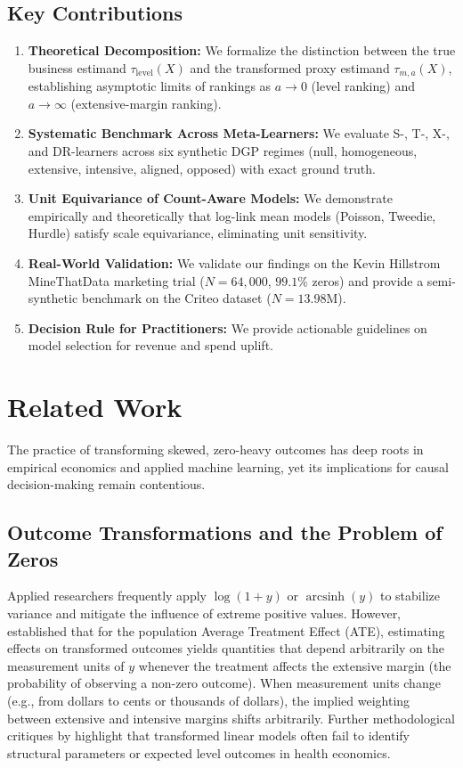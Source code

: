 \documentclass[conference]{IEEEtran}
\newcommand{\taulevel}{\tau_{\text{level}}}
\newcommand{\tauma}{\tau_{m, a}}
\begin{document}
\subsection{Key Contributions}
\begin{enumerate}
    \item \textbf{Theoretical Decomposition:} We formalize the distinction between the true business estimand $\taulevel(X)$ and the transformed proxy estimand $\tauma(X)$, establishing asymptotic limits of rankings as $a \to 0$ (level ranking) and $a \to \infty$ (extensive-margin ranking).
    \item \textbf{Systematic Benchmark Across Meta-Learners:} We evaluate S-, T-, X-, and DR-learners across six synthetic DGP regimes (null, homogeneous, extensive, intensive, aligned, opposed) with exact ground truth.
    \item \textbf{Unit Equivariance of Count-Aware Models:} We demonstrate empirically and theoretically that log-link mean models (Poisson, Tweedie, Hurdle) satisfy scale equivariance, eliminating unit sensitivity.
    \item \textbf{Real-World Validation:} We validate our findings on the Kevin Hillstrom MineThatData marketing trial ($N=64{,}000$, $99.1\%$ zeros) and provide a semi-synthetic benchmark on the Criteo dataset ($N=13.98\text{M}$).
    \item \textbf{Decision Rule for Practitioners:} We provide actionable guidelines on model selection for revenue and spend uplift.
\end{enumerate}

\section{Related Work}
\label{sec:related_work}

The practice of transforming skewed, zero-heavy outcomes has deep roots in empirical economics and applied machine learning, yet its implications for causal decision-making remain contentious.

\subsection{Outcome Transformations and the Problem of Zeros}
Applied researchers frequently apply $\log(1+y)$ or $\operatorname{arcsinh}(y)$ to stabilize variance and mitigate the influence of extreme positive values. However, \cite{chen2024logszeros} established that for the population Average Treatment Effect (ATE), estimating effects on transformed outcomes yields quantities that depend arbitrarily on the measurement units of $y$ whenever the treatment affects the extensive margin (the probability of observing a non-zero outcome). When measurement units change (e.g., from dollars to cents or thousands of dollars), the implied weighting between extensive and intensive margins shifts arbitrarily. Further methodological critiques by \cite{mullahy2024whytransform} highlight that transformed linear models often fail to identify structural parameters or expected level outcomes in health economics.
\end{document}
